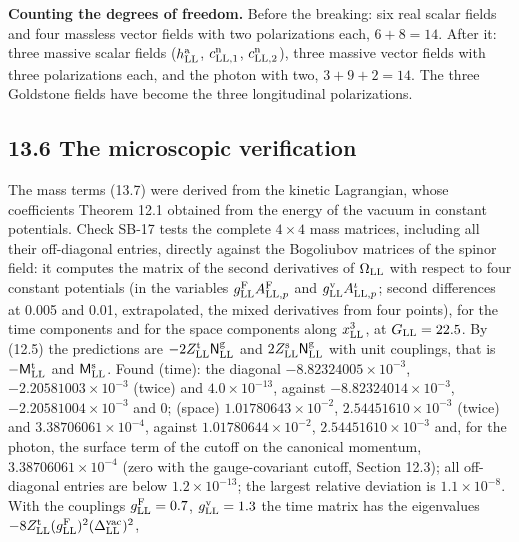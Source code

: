 \documentclass[
  10pt,
]{article}
\begin{document}
\textbf{Counting the degrees of freedom.} Before the breaking: six real
scalar fields and four massless vector fields with two polarizations
each, \(6+8=14\). After it: three massive scalar fields
(\(h^{\rm a}_{\rm LL}\), \(c^{\rm n}_{{\rm LL},1}\),
\(c^{\rm n}_{{\rm LL},2}\)), three massive vector fields with three
polarizations each, and the photon with two, \(3+9+2=14\). The three
Goldstone fields have become the three longitudinal polarizations.

\hypertarget{the-microscopic-verification}{%
\subsection{13.6 The microscopic
verification}\label{the-microscopic-verification}}

The mass terms (13.7) were derived from the kinetic Lagrangian, whose
coefficients Theorem 12.1 obtained from the energy of the vacuum in
constant potentials. Check SB-17 tests the complete \(4\times4\) mass
matrices, including all their off-diagonal entries, directly against the
Bogoliubov matrices of the spinor field: it computes the matrix of the
second derivatives of \(\Omega_{\rm LL}\) with respect to four constant
potentials (in the variables
\(g^{\rm F}_{\rm LL}A^{\rm F}_{{\rm LL},p}\) and
\(g^{\rm v}_{\rm LL}A^\iota_{{\rm LL},p}\); second differences at 0.005
and 0.01, extrapolated, the mixed derivatives from four points), for the
time components and for the space components along \(x^3_{\rm LL}\), at
\(G_{\rm LL}=22.5\). By (12.5) the predictions are
\(-2Z^{\rm t}_{\rm LL}\mathsf N^{\rm g}_{\rm LL}\) and
\(2Z^{\rm s}_{\rm LL}\mathsf N^{\rm g}_{\rm LL}\) with unit couplings,
that is \(-\mathsf M^{\rm t}_{\rm LL}\) and
\(\mathsf M^{\rm s}_{\rm LL}\). Found (time): the diagonal
\(-8.82324005\times10^{-3}\), \(-2.20581003\times10^{-3}\) (twice) and
\(4.0\times10^{-13}\), against \(-8.82324014\times10^{-3}\),
\(-2.20581004\times10^{-3}\) and 0; (space) \(1.01780643\times10^{-2}\),
\(2.54451610\times10^{-3}\) (twice) and \(3.38706061\times10^{-4}\),
against \(1.01780644\times10^{-2}\), \(2.54451610\times10^{-3}\) and,
for the photon, the surface term of the cutoff on the canonical
momentum, \(3.38706061\times10^{-4}\) (zero with the gauge-covariant
cutoff, Section 12.3); all off-diagonal entries are below
\(1.2\times10^{-13}\); the largest relative deviation is
\(1.1\times10^{-8}\). With the couplings \(g^{\rm F}_{\rm LL}=0.7\),
\(g^{\rm v}_{\rm LL}=1.3\) the time matrix has the eigenvalues
\(-8Z^{\rm t}_{\rm LL}(g^{\rm F}_{\rm LL})^2(\Delta^{\rm vac}_{\rm LL})^2\),
\end{document}
